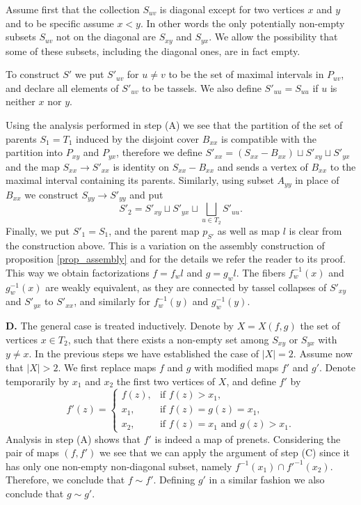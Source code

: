 \documentclass[letterpaper,12pt,leqno]{article}
\numberwithin{equation}{theorem}
\begin{document}
Assume first that the collection $S_{uv}$ is diagonal except for two vertices $x$ and $y$ and to be specific assume $x < y$. In other words the only potentially non-empty subsets
$S_{uv}$ not on the diagonal are $S_{xy}$ and $S_{yx}$.
We allow the possibility that some of these subsets, including the diagonal ones, are in fact empty.

To construct $S'$ we put $S'_{uv}$ for $u \neq v$ to be the set of maximal intervals in $P_{uv}$, and declare all elements of $S'_{uv}$ to be tassels. We also define $S'_{uu} = S_{uu}$ if
$u$ is neither $x$ nor $y$.

Using the analysis performed in step (A) we see that
the partition of the set of parents $S_1 = T_1$ induced by the disjoint cover $B_{xx}$ is compatible with the partition into $P_{xy}$ and $P_{yx}$, therefore we define
$S'_{xx} = (S_{xx} - B_{xx}) \sqcup S'_{xy} \sqcup S'_{yx}$ and the map $S_{xx} \to S'_{xx}$ is identity on $S_{xx} - B_{xx}$ and sends a vertex of $B_{xx}$ to the maximal interval containing
its parents. Similarly, using subset $A_{yy}$ in place of $B_{xx}$ we construct $S_{yy} \to S'_{yy}$ and put
$$
S'_2 = S'_{xy} \sqcup S'_{yx} \sqcup \bigsqcup_{u \in T_2} S'_{uu}.
$$
Finally, we put $S'_1 = S_1$, and the parent map $p_{S'}$ as well as map $l$ is clear from the construction above. This is a variation on the assembly construction of
proposition \ref{prop_assembly} and for the details we refer the reader to its proof.
This way we obtain factorizations $f = f_w l$ and $g = g_w l$. The fibers $f_w^{-1}(x)$ and $g_w^{-1}(x)$ are weakly equivalent, as they are
connected by tassel collapses of $S'_{xy}$ and $S'_{yx}$ to $S'_{xx}$, and similarly for $f_w^{-1}(y)$ and $g_w^{-1}(y)$.

{\bf D.} The general case is treated inductively. Denote by $X = X(f, g)$ the set of vertices $x \in T_2$, such that there exists a non-empty set among $S_{xy}$ or $S_{yx}$ with $y \neq x$.
In the previous steps we have established the case of $|X| = 2$. Assume now that $|X| > 2$.
We first replace maps $f$ and $g$ with modified maps $f'$ and $g'$. Denote temporarily by $x_1$ and $x_2$ the first two vertices of $X$, and define $f'$ by
$$
f'(z) = \begin{cases}
f(z),&\text{if $f(z) > x_1$},\\
x_1,&\text{if $f(z) = g(z) = x_1$},\\
x_2,&\text{if $f(z) = x_1$ and $g(z) > x_1$}.
\end{cases}
$$
Analysis in step (A) shows that $f'$ is indeed a map of prenets. Considering the pair of maps $(f, f')$ we see that we can apply the argument of step (C) since it has only one non-empty
non-diagonal subset, namely $f^{-1}(x_1) \cap f'^{-1}(x_2)$. Therefore, we conclude that $f \sim f'$. Defining $g'$ in a similar fashion we also conclude that $g \sim g'$.
\end{document}
